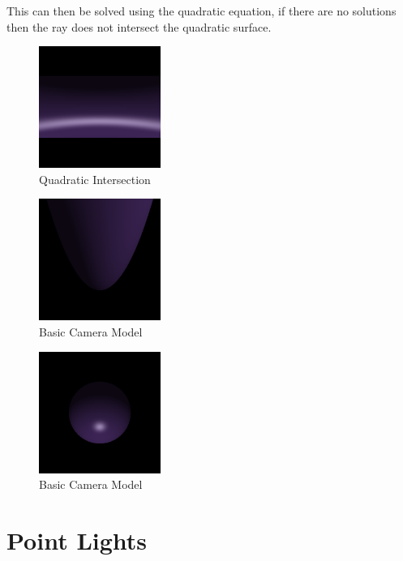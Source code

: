\documentclass{article}
\begin{document}
This can then be solved using the quadratic equation, if there are no solutions
then the ray does not intersect the quadratic surface.

\begin{figure}[H]
  \begin{center}
  \includegraphics[width=150px]{Images/quadCylinder.png}
  \caption{Quadratic Intersection}
  \label{fig:quadint}
  \end{center}
\end{figure}

\begin{figure}[H]
  \begin{center}
  \includegraphics[width=150px]{Images/quadParaboid.png}
  \caption{Basic Camera Model}
  \label{fig:basiccammod}
  \end{center}
\end{figure}

\begin{figure}[H]
  \begin{center}
  \includegraphics[width=150px]{Images/quadSphere.png}
  \caption{Basic Camera Model}
  \label{fig:basiccammod}
  \end{center}
\end{figure}

\section{Point Lights}
\end{document}

